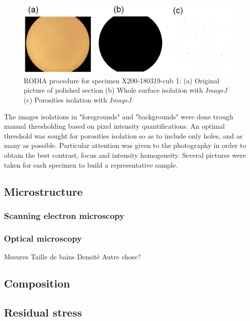 \begin{figure}[ht]
\centering
\centerline{\includegraphics[scale=0.29]{Images/ImageJ-cub1}}
\decoRule
\caption[RODIA procedure for specimen X200-180319-cub 1: (a) Original picture of polished section (b) Whole surface isolation with \textit{ImageJ} (c) Porosities isolation with \textit{ImageJ}.]{RODIA procedure for specimen X200-180319-cub 1: (a) Original picture of polished section (b) Whole surface isolation with \textit{ImageJ} (c) Porosities isolation with \textit{ImageJ}.}
\label{fig:ImageJ}
\end{figure}

The images isolations in "foregrounds" and "backgrounds" were done trough manual thresholding based on pixel intensity quantifications.  %
An optimal threshold was sought for porosities isolation so as to include only holes, and as many as possible. Particular attention was given to the photography in order to obtain the best contrast, focus and intensity homogeneity. Several pictures were taken for each specimen to build a representative sample.

\subsection{Microstructure}

\subsubsection{Scanning electron microscopy}

\subsubsection{Optical microscopy}
Mesures Taille de bains
Densité
Autre chose?
\subsection{Composition}

\subsection{Residual stress}

